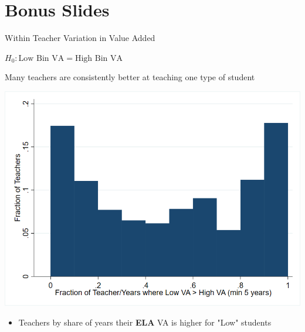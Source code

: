 \documentclass[t,aspectratio=169,11pt]{beamer}
\begin{document}

\appendix
{}





\section{Bonus Slides}


\begin{frame}[label=example]{Within Teacher Variation in Value Added}

    \centering
    $H_0: \text{Low Bin VA} = \text{High Bin VA}$
    \resizebox{.8\textwidth}{!}{}

\hyperlink{het1}{}
\end{frame}



\begin{frame}[c, label=ela_bin_diff]{Many teachers are consistently better at teaching one type of student}
\begin{center}


\includegraphics[width=.65\textwidth]{Working_Paper/WP_Figures/ELA_Bin_Diff.png}
\begin{itemize}
    \item Teachers by share of years their \textbf{ELA} VA is higher for "Low" students \hyperlink{math_bin_diff}{}
\end{itemize}
\end{center}

\end{frame}
\end{document}
